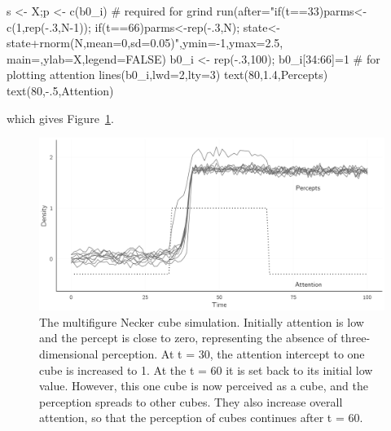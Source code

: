 \documentclass[
  a4paper,
  DIV=11,
  numbers=noendperiod,
  oneside]{scrreprt}
\newenvironment{Shaded}{\begin{snugshade}}{\end{snugshade}}
\newcommand{\AttributeTok}[1]{\textcolor[rgb]{0.40,0.45,0.13}{#1}}
\newcommand{\CommentTok}[1]{\textcolor[rgb]{0.37,0.37,0.37}{#1}}
\newcommand{\ConstantTok}[1]{\textcolor[rgb]{0.56,0.35,0.01}{#1}}
\newcommand{\DecValTok}[1]{\textcolor[rgb]{0.68,0.00,0.00}{#1}}
\newcommand{\FloatTok}[1]{\textcolor[rgb]{0.68,0.00,0.00}{#1}}
\newcommand{\FunctionTok}[1]{\textcolor[rgb]{0.28,0.35,0.67}{#1}}
\newcommand{\NormalTok}[1]{\textcolor[rgb]{0.00,0.23,0.31}{#1}}
\newcommand{\OtherTok}[1]{\textcolor[rgb]{0.00,0.23,0.31}{#1}}
\newcommand{\SpecialCharTok}[1]{\textcolor[rgb]{0.37,0.37,0.37}{#1}}
\newcommand{\StringTok}[1]{\textcolor[rgb]{0.13,0.47,0.30}{#1}}
\begin{document}
\begin{Shaded}
\begin{Highlighting}[]
\NormalTok{s }\OtherTok{\textless{}{-}}\NormalTok{ X;p }\OtherTok{\textless{}{-}} \FunctionTok{c}\NormalTok{(b0\_i) }\CommentTok{\# required for grind}
\FunctionTok{run}\NormalTok{(}\AttributeTok{after=}\StringTok{"if(t==33)parms\textless{}{-}c(1,rep({-}.3,N{-}1));}
\StringTok{           if(t==66)parms\textless{}{-}rep({-}.3,N);}
\StringTok{           state\textless{}{-}state+rnorm(N,mean=0,sd=0.05)"}\NormalTok{,}\AttributeTok{ymin=}\SpecialCharTok{{-}}\DecValTok{1}\NormalTok{,}\AttributeTok{ymax=}\FloatTok{2.5}\NormalTok{,}
            \AttributeTok{main=}\StringTok{\textquotesingle{}\textquotesingle{}}\NormalTok{,}\AttributeTok{ylab=}\StringTok{\textquotesingle{}X\textquotesingle{}}\NormalTok{,}\AttributeTok{legend=}\ConstantTok{FALSE}\NormalTok{)}
\NormalTok{b0\_i }\OtherTok{\textless{}{-}} \FunctionTok{rep}\NormalTok{(}\SpecialCharTok{{-}}\NormalTok{.}\DecValTok{3}\NormalTok{,}\DecValTok{100}\NormalTok{); b0\_i[}\DecValTok{34}\SpecialCharTok{:}\DecValTok{66}\NormalTok{]}\OtherTok{=}\DecValTok{1} \CommentTok{\# for plotting attention}
\FunctionTok{lines}\NormalTok{(b0\_i,}\AttributeTok{lwd=}\DecValTok{2}\NormalTok{,}\AttributeTok{lty=}\DecValTok{3}\NormalTok{)}
\FunctionTok{text}\NormalTok{(}\DecValTok{80}\NormalTok{,}\FloatTok{1.4}\NormalTok{,}\StringTok{\textquotesingle{}Percepts\textquotesingle{}}\NormalTok{)}
\FunctionTok{text}\NormalTok{(}\DecValTok{80}\NormalTok{,}\SpecialCharTok{{-}}\NormalTok{.}\DecValTok{5}\NormalTok{,}\StringTok{\textquotesingle{}Attention\textquotesingle{}}\NormalTok{)}
\end{Highlighting}
\end{Shaded}

which gives Figure~\ref{fig-ch4n-img19-old-67}.

\begin{figure}

{\centering \includegraphics{media/ch4n/fig-ch4n-img19-old-67.png}

}

\caption{\label{fig-ch4n-img19-old-67}The multifigure Necker cube
simulation. Initially attention is low and the percept is close to zero,
representing the absence of three-dimensional perception. At t = 30, the
attention intercept to one cube is increased to 1. At the t = 60 it is
set back to its initial low value. However, this one cube is now
perceived as a cube, and the perception spreads to other cubes. They
also increase overall attention, so that the perception of cubes
continues after t = 60.}

\end{figure}
\end{document}

